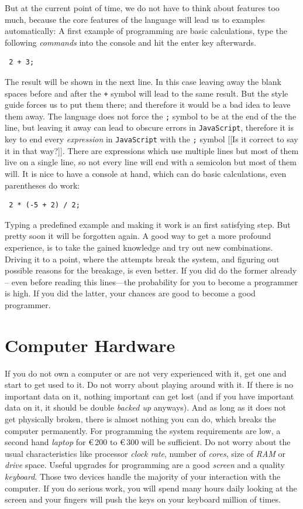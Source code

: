 \documentclass[a4paper,10pt]{scrbook}
\begin{document}
But at the current point of time, we do not have to think about features too much, because the core features of the language will lead us to examples automatically:
A first example of programming are basic calculations, type the following \emph{commands} into the console and hit the enter key afterwards.
\begin{lstlisting}
 2 + 3;
\end{lstlisting}
The result will be shown in the next line.
In this case leaving away the blank spaces before and after the \texttt{+} symbol will lead to the same result.
But the style guide forces us to put them there; and therefore it would be a bad idea to leave them away.
The language does not force the \texttt{;} symbol to be at the end of the the line, but leaving it away can lead to obscure errors in \texttt{JavaScript}, therefore it is key to end every \emph{expression} in \texttt{JavaScript} with the \texttt{;} symbol [[Is it correct to say it in that way?]].
There are expressions which use multiple lines but most of them live on a single line, so not every line will end with a semicolon but most of them will.
It is nice to have a console at hand, which can do basic calculations, even parentheses do work:
\begin{lstlisting}
 2 * (-5 + 2) / 2;
\end{lstlisting}
Typing a predefined example and making it work is an first satisfying step.
But pretty soon it will be forgotten again.
A good way to get a more profound experience, is to take the gained knowledge and try out new combinations.
Driving it to a point, where the attempts break the system, and figuring out possible reasons for the breakage, is even better.
If you did do the former already -- even before reading this lines---the probability for you to become a programmer is high.
If you did the latter, your chances are good to become a good programmer.

\section{Computer Hardware}

If you do not own a computer or are not very experienced with it, get one and start to get used to it.
Do not worry about playing around with it.
If there is no important data on it, nothing important can get lost (and if you have important data on it, it should be double \emph{backed up} anyways).
And as long as it does not get physically broken, there is almost nothing you can do, which breaks the computer permanently.
For programming the system requirements are low, a second hand \emph{laptop} for €\,200 to €\,300 will be sufficient.
Do not worry about the usual characteristics like processor \emph{clock rate}, number of \emph{cores}, size of \emph{RAM} or \emph{drive} space.
Useful upgrades for programming are a good \emph{screen} and a quality \emph{keyboard}.
Those two devices handle the majority of your interaction with the computer.
If you do serious work, you will spend many hours daily looking at the screen and your fingers will push the keys on your keyboard million of times.
\end{document}
